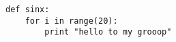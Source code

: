 \documentclass{scrreprt}
\begin{document}
\begin{lstlisting}[firstnumber=1]
def sinx:
    for i in range(20):
        print "hello to my grooop"
\end{lstlisting}
\end{document}
